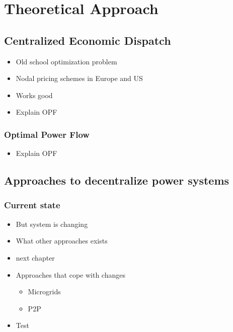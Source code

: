 \section{Theoretical Approach}
\label{sec:theo}

\subsection{Centralized Economic Dispatch}

\begin{itemize}
	\item Old school optimization problem
	\item Nodal pricing schemes in Europe and US
	\item Works good
	\item Explain OPF
\end{itemize}

\subsubsection{Optimal Power Flow}

\begin{itemize}
	\item Explain OPF
\end{itemize}

\subsection{Approaches to decentralize power systems}
\label{subsec:decentralization}

\subsubsection{Current state}

\begin{itemize}
	\item But system is changing
	\item What other approaches exists
	\item next chapter	
	\item Approaches that cope with changes
	\begin{itemize}
		\item Microgrids
		\item P2P
	\end{itemize}
	\item Test
\end{itemize}

